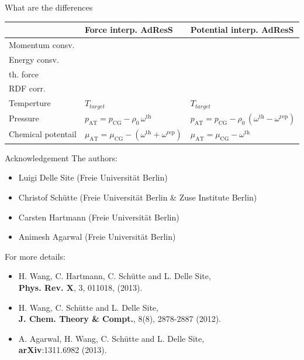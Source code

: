\documentclass[]{beamer}
\newcommand{\redc}[1]{{\color{red} #1}}
\newcommand{\bluec}[1]{{\color{blue} #1}}
\newcommand{\AT}{{\textrm{{AT}}}}
\newcommand{\CG}{{\textrm{CG}}}
\newcommand{\thf}{{\textrm{th}}}
\newcommand{\rep}{{\textrm{rep}}}
\newcommand{\tickYes}{\checkmark}
\newcommand{\tickNo}{\hspace{1pt}\ding{55}}
\begin{document}
\begin{frame}{What are the differences}
  \small{
  \begin{table}
    \centering
    \begin{tabular*}{0.95\textwidth}{@{\extracolsep{\fill}}lll}
      &         Force interp. AdResS     &       Potential interp. AdResS \\\hline
      Momentum consv.     &       \bluec{\tickYes}        &       \redc{\tickNo}\\      
      \rowcolor{MyGray}
      Energy consv. &     \redc{\tickNo}  &       \bluec{\tickYes}\\
      th. force &  \bluec{\tickYes} &  \bluec{\tickYes}\\
      \rowcolor{MyGray}
      RDF corr. &  \bluec{\tickYes} &  \redc{\tickNo}\\
      Temperture          &     \bluec{$T_{target}$}      & \bluec{$T_{target}$}\\
      \rowcolor{MyGray}
      Pressure          &   \bluec{$p_\AT = p_\CG - \rho_0\, \omega^\thf$} &
      \bluec{$p_\AT = p_\CG - \rho_0\, (\omega^\thf - \omega^\rep)$}\\
      Chemical potentail          &   \bluec{$\mu_\AT = \mu_\CG - (\omega^\thf +\omega^\rep)$} &
      \bluec{$\mu_\AT = \mu_\CG - \omega^\thf$}
    \end{tabular*}
  \end{table}
  }
\end{frame}


\begin{frame}{Acknowledgement}
  \vfill
  The authors:
  \begin{itemize}
  \item Luigi Delle Site (Freie Universit\"at Berlin)
  \item Christof Sch\"utte (Freie Universit\"at Berlin \& Zuse Institute Berlin)
  \item Carsten Hartmann (Freie Universit\"at Berlin)
  \item Animesh Agarwal (Freie Universit\"at Berlin)
  \end{itemize}
  \vfill
  For more details:
  \begin{itemize}
  \item H. Wang, C. Hartmann, C. Sch\"utte and L. Delle Site,\\
    \textbf{Phys. Rev. X}, 3, 011018, (2013).
  \item H. Wang, C. Sch\"utte and L. Delle Site,\\
    \textbf{J. Chem. Theory \& Compt.}, 8(8), 2878-2887 (2012).
  \item A. Agarwal, H. Wang, C. Sch\"utte and L. Delle Site,\\
    \textbf{arXiv}:1311.6982 (2013).
  \end{itemize}
  \vfill
\end{frame}
\end{document}
